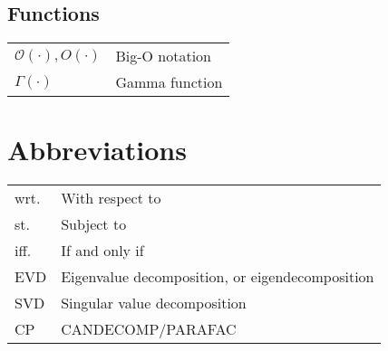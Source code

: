 \documentclass{article}
\begin{document}
\subsection{Functions}
\begin{xltabular}{\textwidth}{XX}
    \(\mathcal{O}(\cdot), O(\cdot)\) & Big-O notation\\
    \(\Gamma(\cdot)\) & Gamma function\\
\end{xltabular}

\section{Abbreviations}
    \begin{xltabular}{\textwidth}{XX}
        wrt. & With respect to\\
        st. & Subject to\\
        iff. & If and only if\\
        EVD & Eigenvalue decomposition, or eigendecomposition\\
        SVD & Singular value decomposition\\
        CP & CANDECOMP/PARAFAC\\
    \end{xltabular}
\end{document}
